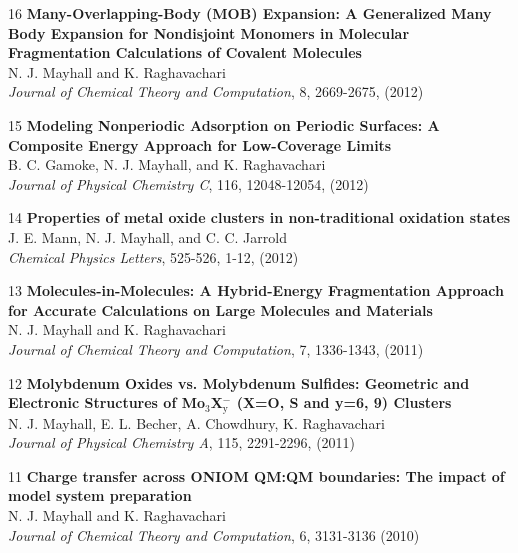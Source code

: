 \documentclass[10pt]{article}
\newenvironment{lonelist}[1][\enskip\textbullet]%
        {\vspace{-\baselineskip}\begin{list}{#1}{%
        \setlength{\partopsep}{0pt}%
        \setlength{\topsep}{0pt}}}
        {\end{list}\vspace{-.6\baselineskip}}
\begin{document}
\begin{lonelist}
\item [16\hspace{4pt}]
\textbf{Many-Overlapping-Body (MOB) Expansion: A Generalized Many Body Expansion for Nondisjoint Monomers in Molecular Fragmentation Calculations of Covalent Molecules} \\
N. J. Mayhall and K. Raghavachari \\
\textsl{Journal of Chemical Theory and Computation}, 8, 2669-2675, (2012)

\item[15\hspace{4pt}] \textbf{Modeling Nonperiodic Adsorption on Periodic Surfaces: A Composite Energy Approach for Low-Coverage Limits}\\
B. C. Gamoke, N. J. Mayhall, and K. Raghavachari \\
\textsl{Journal of Physical Chemistry C}, 116, 12048-12054, (2012)

\item[14\hspace{4pt}] \textbf{Properties of metal oxide clusters in non-traditional oxidation states}\\
J. E. Mann, N. J. Mayhall, and C. C. Jarrold\\
 \textsl{Chemical Physics Letters}, 525-526, 1-12, (2012)

\item[13\hspace{4pt}] \textbf{Molecules-in-Molecules: A Hybrid-Energy Fragmentation Approach for Accurate Calculations on Large Molecules and Materials}\\
N. J. Mayhall and K. Raghavachari\\
\textsl{Journal of Chemical Theory and Computation}, 7, 1336-1343, (2011)

\item[12\hspace{4pt}] \textbf{Molybdenum Oxides vs. Molybdenum Sulfides: Geometric and Electronic Structures of Mo$_{3}$X$_{\text{y}}^{-}$ (X=O, S and y=6, 9) Clusters}\\
N. J. Mayhall, E. L. Becher, A. Chowdhury, K. Raghavachari\\
\textsl{Journal of Physical Chemistry A}, 115, 2291-2296, (2011)

\item[11\hspace{4pt}] \textbf{Charge transfer across ONIOM QM:QM boundaries: The impact of model system preparation}\\
N. J. Mayhall and K. Raghavachari\\
 \textsl{Journal of Chemical Theory and Computation}, 6, 3131-3136 (2010)


\end{lonelist}
\end{document}
